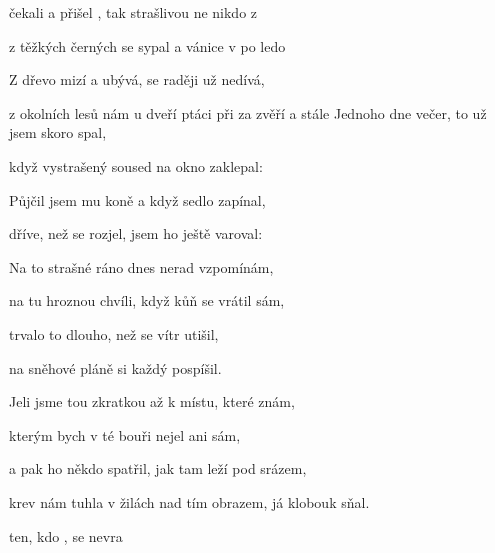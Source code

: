 
\zs
{} čekali  a  přišel ,
tak strašlivou  ne nikdo z 

z těžkých černých  se  sypal 
a vánice  v po ledo

Z  dřevo mizí a  ubývá,
 se raději už  nedívá,

 z okolních lesů nám  u dveří
 ptáci při za zvěří a stále 
\ks
\zs
Jednoho dne večer, to už jsem skoro spal,

když vystrašený soused na okno zaklepal:


Půjčil jsem mu koně a když sedlo zapínal,

dříve, než se rozjel, jsem ho ještě varoval:

\ks
\zs
Na to strašné ráno dnes nerad vzpomínám,

na tu hroznou chvíli, když kůň se vrátil sám,

trvalo to dlouho, než se vítr utišil,

na sněhové pláně si každý pospíšil.

Jeli jsme tou zkratkou až k místu, které znám,

kterým bych v té bouři nejel ani sám,

a pak ho někdo spatřil, jak tam leží pod srázem,

krev nám tuhla v žilách nad tím obrazem, já klobouk sňal.
\ks

 ten, kdo , se  nevra
\kp





